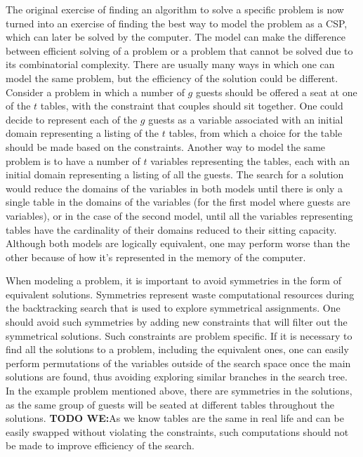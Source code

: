 \documentclass{l4proj}
\begin{document}
\noindent The original exercise of finding an algorithm to solve a specific problem is now turned into an exercise of finding the best way to model the problem as a CSP, which can later be solved by the computer. The model can make the difference between efficient solving of a problem or a problem that cannot be solved due to its combinatorial complexity. There are usually many ways in which one can model the same problem, but the efficiency of the solution could be different. Consider a problem in which a number of $g$ guests should be offered a seat at one of the $t$ tables, with the constraint that couples should sit together. One could decide to represent each of the $g$ guests as a variable associated with an initial domain representing a listing of the $t$ tables, from which a choice for the table should be made based on the constraints. Another way to model the same problem is to have a number of $t$ variables representing the tables, each with an initial domain representing a listing of all the guests. The search for a solution would reduce the domains of the variables in both models until there is only a single table in the domains of the variables (for the first model where guests are variables), or in the case of the second model, until all the variables representing tables have the cardinality of their domains reduced to their sitting capacity. Although both models are logically equivalent, one may perform worse than the other because of how it’s represented in the memory of the computer.

\noindent When modeling a problem, it is important to avoid symmetries in the form of equivalent solutions. Symmetries represent waste computational resources during the backtracking search that is used to explore symmetrical assignments. One should avoid such symmetries by adding new constraints that will filter out the symmetrical solutions. Such constraints are problem specific. If it is necessary to find all the solutions to a problem, including the equivalent ones, one can easily perform permutations of the variables outside of the search space once the main solutions are found, thus avoiding exploring similar branches in the search tree. In the example problem mentioned above, there are symmetries in the solutions, as the same group of guests will be seated at different tables throughout the solutions. \textbf{TODO WE:}As we know tables are the same in real life and can be easily swapped without violating the constraints, such computations should not be made to improve efficiency of the search.
\end{document}
